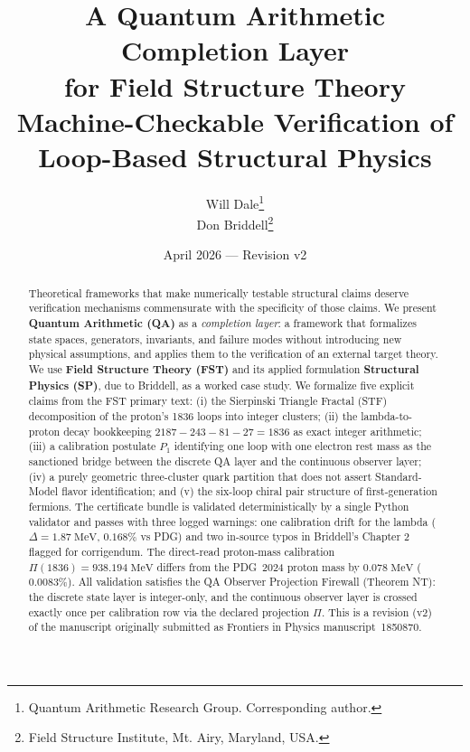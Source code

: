 \documentclass[12pt,a4paper]{article}
\title{A Quantum Arithmetic Completion Layer\\for Field Structure Theory\\[6pt]
\large Machine-Checkable Verification of Loop-Based Structural Physics}
\author{Will Dale\thanks{Quantum Arithmetic Research Group.
Corresponding author.} \\
Don Briddell\thanks{Field Structure Institute, Mt. Airy, Maryland, USA.}}
\date{April 2026 --- Revision v2}
\begin{document}
\maketitle


\begin{abstract}
Theoretical frameworks that make numerically testable structural claims
deserve verification mechanisms commensurate with the specificity of those
claims. We present \textbf{Quantum Arithmetic (QA)} as a \emph{completion
layer}: a framework that formalizes state spaces, generators, invariants, and
failure modes without introducing new physical assumptions, and applies them
to the verification of an external target theory. We use \textbf{Field
Structure Theory (FST)} and its applied formulation \textbf{Structural
Physics (SP)}, due to Briddell, as a worked case study.
We formalize five explicit claims from the FST primary text: (i) the
Sierpinski Triangle Fractal (STF) decomposition of the proton's 1836 loops
into integer clusters; (ii) the lambda-to-proton decay bookkeeping
$2187 - 243 - 81 - 27 = 1836$ as exact integer arithmetic; (iii) a calibration
postulate $P_1$ identifying one loop with one electron rest mass as the
sanctioned bridge between the discrete QA layer and the continuous observer
layer; (iv) a purely geometric three-cluster quark partition that does not
assert Standard-Model flavor identification; and (v) the six-loop chiral pair
structure of first-generation fermions. The certificate bundle is validated
deterministically by a single Python validator and passes with three
logged warnings: one calibration drift for the lambda
($\Delta = 1.87\;\mathrm{MeV}$, $0.168\%$ vs PDG) and two in-source typos
in Briddell's Chapter 2 flagged for corrigendum. The direct-read proton-mass
calibration $\Pi(1836) = 938.194\;\mathrm{MeV}$ differs from the
PDG~2024 proton mass by $0.078\;\mathrm{MeV}$ ($0.0083\%$). All validation
satisfies the QA Observer Projection Firewall (Theorem NT): the discrete
state layer is integer-only, and the continuous observer layer is crossed
exactly once per calibration row via the declared projection $\Pi$.
This is a revision (v2) of the manuscript originally submitted as
Frontiers in Physics manuscript~1850870.
\end{abstract}

\end{document}

